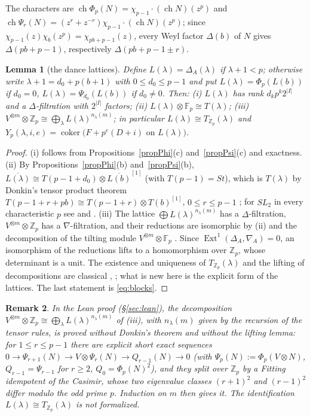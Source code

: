 \documentclass[10pt]{article}
\theoremstyle{ds}
\newtheorem{lemma}{Lemma}
\theoremstyle{dsrem}
\newtheorem{remark}[lemma]{Remark}
\newcommand{\Z}{\mathbb{Z}}
\newcommand{\F}{\mathbb{F}}
\newcommand{\coker}{\operatorname{coker}}
\begin{document}
The characters are $\operatorname{ch}\Phi_p(N)=\chi_{p-1}\cdot(\operatorname{ch}N)(z^p)$ and $\operatorname{ch}\Psi_r(N)=(z^r+z^{-r})\chi_{p-1}\cdot(\operatorname{ch}N)(z^p)$; since $\chi_{p-1}(z)\chi_b(z^p)=\chi_{pb+p-1}(z)$, every Weyl factor $\Delta(b)$ of $N$ gives $\Delta(pb+p-1)$, respectively $\Delta(pb+p-1\pm r)$.

\begin{lemma}[the dance lattices]\label{dance}
Define $L(\lambda)=\Delta_A(\lambda)$ if $\lambda+1<p$; otherwise write $\lambda+1=d_0+p(b+1)$ with $0\le d_0\le p-1$ and put $L(\lambda)=\Phi_p(L(b))$ if $d_0=0$, $L(\lambda)=\Psi_{d_0}(L(b))$ if $d_0\ne0$. Then:
(i) $L(\lambda)$ has rank $d_kp^k2^{|I|}$ and a $\Delta$-filtration with $2^{|I|}$ factors;
(ii) $L(\lambda)\otimes\F_p\cong T(\lambda)$;
(iii) $V^{\otimes m}\otimes\Z_p\cong\bigoplus_\lambda L(\lambda)^{n_\lambda(m)}$; in particular $L(\lambda)\cong T_{\Z_p}(\lambda)$ and $Y_p(\lambda,i,e)=\coker\big(F+p^e(D+i)\text{ on }L(\lambda)\big)$.
\end{lemma}

\begin{proof}
(i) follows from Propositions~\ref{propPhi}(c) and~\ref{propPsi}(c) and exactness. (ii) By Propositions~\ref{propPhi}(b) and~\ref{propPsi}(b), $\overline{L(\lambda)}\cong T(p-1+d_0)\otimes\overline{L(b)}^{[1]}$ (with $T(p-1)=St$), which is $T(\lambda)$ by Donkin's tensor product theorem $T(p-1+r+pb)\cong T(p-1+r)\otimes T(b)^{[1]}$, $0\le r\le p-1$ \cite[Prop.~2.1]{Don}; for $SL_2$ in every characteristic $p$ see \cite[Prop.~3.4(a)]{STWZ} and \cite[Remark~1.1(ii)]{And}. (iii) The lattice $\bigoplus L(\lambda)^{n_\lambda(m)}$ has a $\Delta$-filtration, $V^{\otimes m}\otimes\Z_p$ has a $\nabla$-filtration, and their reductions are isomorphic by (ii) and the decomposition of the tilting module $V^{\otimes m}\otimes\F_p$ \cite[E.6]{Jan}. Since $\operatorname{Ext}^1(\Delta_A,\nabla_A)=0$, an isomorphism of the reductions lifts to a homomorphism over $\Z_p$, whose determinant is a unit. The existence and uniqueness of $T_{\Z_p}(\lambda)$ and the lifting of decompositions are classical \cite[\S1.2]{And}, \cite[II.E.19--E.22]{Jan}; what is new here is the explicit form of the lattices. The last statement is \eqref{eq:blocks}.
\end{proof}

\begin{remark}
In the Lean proof (\S\ref{sec:lean}), the decomposition $V^{\otimes m}\otimes\Z_p\cong\bigoplus_\lambda L(\lambda)^{n_\lambda(m)}$ of (iii), with $n_\lambda(m)$ given by the recursion of the tensor rules, is proved without Donkin's theorem and without the lifting lemma: for $1\le r\le p-1$ there are explicit short exact sequences $0\to\Psi_{r+1}(N)\to V\otimes\Psi_r(N)\to Q_{r-1}(N)\to0$ (with $\Psi_p(N):=\Phi_p(V\otimes N)$, $Q_{r-1}=\Psi_{r-1}$ for $r\ge2$, $Q_0=\Phi_p(N)^2$), and they split over $\Z_p$ by a Fitting idempotent of the Casimir, whose two eigenvalue classes $(r+1)^2$ and $(r-1)^2$ differ modulo the odd prime $p$. Induction on $m$ then gives it. The identification $L(\lambda)\cong T_{\Z_p}(\lambda)$ is not formalized.
\end{remark}
\end{document}
